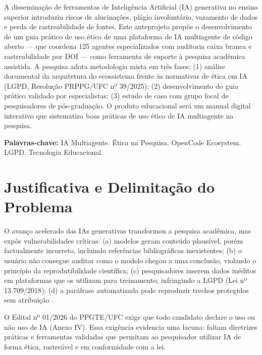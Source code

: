 \documentclass[
    12pt,
    openany,
    oneside,
    a4paper,
    brazilian
]{abntex2}
\begin{document}
\begin{resumo}
A disseminação de ferramentas de Inteligência Artificial (IA) generativa no ensino superior introduziu riscos de alucinações, plágio involuntário, vazamento de dados e perda de rastreabilidade de fontes. Este anteprojeto propõe o desenvolvimento de um guia prático de uso ético de uma plataforma de IA multiagente de código aberto --- que coordena 125 agentes especializados com auditoria caixa branca e rastreabilidade por DOI --- como ferramenta de suporte à pesquisa acadêmica assistida. A pesquisa adota metodologia mista em três fases: (1) análise documental da arquitetura do ecossistema frente às normativas de ética em IA (LGPD, Resolução PRPPG/UFC nº 39/2025); (2) desenvolvimento do guia prático validado por especialistas; (3) estudo de caso com grupo focal de pesquisadores de pós-graduação. O produto educacional será um manual digital interativo que sistematiza boas práticas de uso ético de IA multiagente na pesquisa.

\vspace{0.3cm}
\noindent\textbf{Palavras-chave:} IA Multiagente. Ética na Pesquisa. OpenCode Ecosystem. LGPD. Tecnologia Educacional.
\end{resumo}

\tableofcontents
\clearpage

\section{Justificativa e Delimitação do Problema}

O avanço acelerado das IAs generativas transformou a pesquisa acadêmica, mas expôs vulnerabilidades críticas: (a) modelos geram conteúdo plausível, porém factualmente incorreto, incluindo referências bibliográficas inexistentes; (b) o usuário não consegue auditar como o modelo chegou a uma conclusão, violando o princípio da reprodutibilidade científica; (c) pesquisadores inserem dados inéditos em plataformas que os utilizam para treinamento, infringindo a LGPD (Lei nº 13.709/2018); (d) a paráfrase automatizada pode reproduzir trechos protegidos sem atribuição \cite{floridi2023, russell2022}.

O Edital nº 01/2026 do PPGTE/UFC exige que todo candidato declare o uso ou não uso de IA (Anexo IV). Essa exigência evidencia uma lacuna: faltam diretrizes práticas e ferramentas validadas que permitam ao pesquisador utilizar IA de forma ética, rastreável e em conformidade com a lei.
\end{document}
